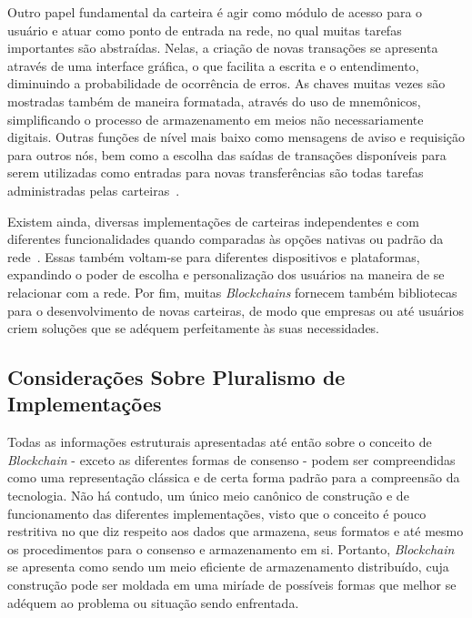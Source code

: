 %
Outro papel fundamental da carteira é agir como módulo de acesso para o usuário e atuar como ponto de entrada na rede, no qual muitas tarefas importantes são abstraídas. Nelas, a criação de novas transações se apresenta através de uma interface gráfica, o que facilita a escrita e o entendimento, diminuindo a probabilidade de ocorrência de erros. As chaves muitas vezes são mostradas também de maneira formatada, através do uso de mnemônicos, simplificando o processo de armazenamento em meios não necessariamente digitais. Outras funções de nível mais baixo como mensagens de aviso e requisição para outros nós, bem como a escolha das saídas de transações disponíveis para serem utilizadas como entradas para novas transferências são todas tarefas administradas pelas carteiras~\cite{blockchain:mastering_bitcoin}.

%
Existem ainda, diversas implementações de carteiras independentes e com diferentes funcionalidades quando comparadas às opções nativas ou padrão da rede~\cite{blockchain:mastering_bitcoin}. Essas também voltam-se para diferentes dispositivos e plataformas, expandindo o poder de escolha e personalização dos usuários na maneira de se relacionar com a rede. Por fim, muitas \textit{Blockchains} fornecem também bibliotecas para o desenvolvimento de novas carteiras, de modo que empresas ou até usuários criem soluções que se adéquem perfeitamente às suas necessidades.

\subsection{Considerações Sobre Pluralismo de Implementações}
\label{subsec:blobkchain:implementacoes}

Todas as informações estruturais apresentadas até então sobre o conceito de \textit{Blockchain} - exceto as diferentes formas de consenso - podem ser compreendidas como uma representação clássica e de certa forma padrão para a compreensão da tecnologia. Não há contudo, um único meio canônico de construção e de funcionamento das diferentes implementações, visto que o conceito é pouco restritiva no que diz respeito aos dados que armazena, seus formatos e até mesmo os procedimentos para o consenso e armazenamento em si. Portanto, \textit{Blockchain} se apresenta como sendo um meio eficiente de armazenamento distribuído, cuja construção pode ser moldada em uma miríade de possíveis formas que melhor se adéquem ao problema ou situação sendo enfrentada.

